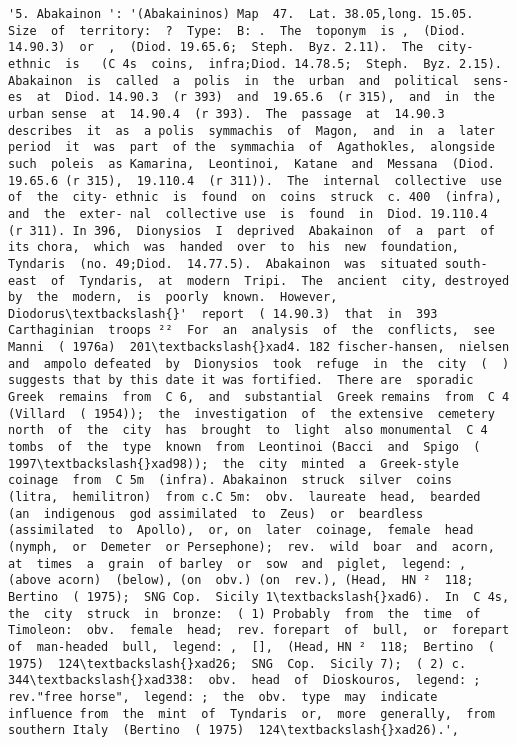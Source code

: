 \documentclass[11pt]{article}
\begin{document}
\begin{Verbatim}[commandchars=\\\{\}]
         '5. Abakainon ': '(Abakaininos) Map  47.  Lat. 38.05,long. 15.05.  Size  of  territory:  ?  Type:  B: .  The  toponym  is ,  (Diod. 14.90.3)  or  ,  (Diod. 19.65.6;  Steph.  Byz. 2.11).  The  city-ethnic  is   (C 4s  coins,  infra;Diod. 14.78.5;  Steph.  Byz. 2.15). Abakainon  is  called  a  polis  in  the  urban  and  political  sens- es  at  Diod. 14.90.3  (r 393)  and  19.65.6  (r 315),  and  in  the  urban sense  at  14.90.4  (r 393).  The  passage  at  14.90.3  describes  it  as  a polis  symmachis  of  Magon,  and  in  a  later  period  it  was  part  of the  symmachia  of  Agathokles,  alongside  such  poleis  as Kamarina,  Leontinoi,  Katane  and  Messana  (Diod. 19.65.6 (r 315),  19.110.4  (r 311)).  The  internal  collective  use  of  the  city- ethnic  is  found  on  coins  struck  c. 400  (infra),  and  the  exter- nal  collective use  is  found  in  Diod. 19.110.4  (r 311). In 396,  Dionysios  I  deprived  Abakainon  of  a  part  of  its chora,  which  was  handed  over  to  his  new  foundation, Tyndaris  (no. 49;Diod.  14.77.5).  Abakainon  was  situated south-east  of  Tyndaris,  at  modern  Tripi.  The  ancient  city, destroyed  by  the  modern,  is  poorly  known.  However, Diodorus\textbackslash{}'  report  ( 14.90.3)  that  in  393  Carthaginian  troops ²²  For  an  analysis  of  the  conflicts,  see  Manni  ( 1976a)  201\textbackslash{}xad4. 182 fischer-hansen,  nielsen  and  ampolo defeated  by  Dionysios  took  refuge  in  the  city  (  ) suggests that by this date it was fortified.  There are  sporadic  Greek  remains  from  C 6,  and  substantial  Greek remains  from  C 4  (Villard  ( 1954));  the  investigation  of  the extensive  cemetery  north  of  the  city  has  brought  to  light  also monumental  C 4  tombs  of  the  type  known  from  Leontinoi (Bacci  and  Spigo  ( 1997\textbackslash{}xad98));  the  city  minted  a  Greek-style coinage  from  C 5m  (infra). Abakainon  struck  silver  coins  (litra,  hemilitron)  from c.C 5m:  obv.  laureate  head,  bearded  (an  indigenous  god assimilated  to  Zeus)  or  beardless  (assimilated  to  Apollo),  or, on  later  coinage,  female  head  (nymph,  or  Demeter  or Persephone);  rev.  wild  boar  and  acorn,  at  times  a  grain  of barley  or  sow  and  piglet,  legend: ,  (above acorn)  (below), (on  obv.) (on  rev.), (Head,  HN ²  118;  Bertino  ( 1975);  SNG Cop.  Sicily 1\textbackslash{}xad6).  In  C 4s,  the  city  struck  in  bronze:  ( 1) Probably  from  the  time  of  Timoleon:  obv.  female  head;  rev. forepart  of  bull,  or  forepart  of  man-headed  bull,  legend: ,  [],  (Head, HN ²  118;  Bertino  ( 1975)  124\textbackslash{}xad26;  SNG  Cop.  Sicily 7);  ( 2) c. 344\textbackslash{}xad338:  obv.  head  of  Dioskouros,  legend: ;  rev."free horse",  legend: ;  the  obv.  type  may  indicate  influence from  the  mint  of  Tyndaris  or,  more  generally,  from  southern Italy  (Bertino  ( 1975)  124\textbackslash{}xad26).',

\end{Verbatim}
\end{document}
